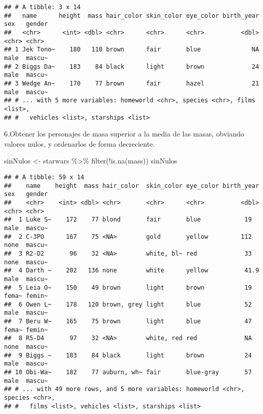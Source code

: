 \documentclass[
]{book}
\newenvironment{Shaded}{\begin{snugshade}}{\end{snugshade}}
\newcommand{\FunctionTok}[1]{\textcolor[rgb]{0.00,0.00,0.00}{#1}}
\newcommand{\NormalTok}[1]{#1}
\newcommand{\OtherTok}[1]{\textcolor[rgb]{0.56,0.35,0.01}{#1}}
\newcommand{\SpecialCharTok}[1]{\textcolor[rgb]{0.00,0.00,0.00}{#1}}
\begin{document}
\begin{verbatim}
## # A tibble: 3 x 14
##   name      height  mass hair_color skin_color eye_color birth_year sex   gender
##   <chr>      <int> <dbl> <chr>      <chr>      <chr>          <dbl> <chr> <chr> 
## 1 Jek Tono~    180   110 brown      fair       blue              NA male  mascu~
## 2 Biggs Da~    183    84 black      light      brown             24 male  mascu~
## 3 Wedge An~    170    77 brown      fair       hazel             21 male  mascu~
## # ... with 5 more variables: homeworld <chr>, species <chr>, films <list>,
## #   vehicles <list>, starships <list>
\end{verbatim}

6.Obtener los personajes de masa superior a la media de las masas, obviando valores nulos, y ordenarlos de forma decreciente.

\begin{Shaded}
\begin{Highlighting}[]
\NormalTok{sinNulos }\OtherTok{\textless{}{-}}\NormalTok{ starwars }\SpecialCharTok{\%\textgreater{}\%} \FunctionTok{filter}\NormalTok{(}\SpecialCharTok{!}\FunctionTok{is.na}\NormalTok{(mass))}
\NormalTok{sinNulos}
\end{Highlighting}
\end{Shaded}

\begin{verbatim}
## # A tibble: 59 x 14
##    name    height  mass hair_color  skin_color eye_color birth_year sex   gender
##    <chr>    <int> <dbl> <chr>       <chr>      <chr>          <dbl> <chr> <chr> 
##  1 Luke S~    172    77 blond       fair       blue            19   male  mascu~
##  2 C-3PO      167    75 <NA>        gold       yellow         112   none  mascu~
##  3 R2-D2       96    32 <NA>        white, bl~ red             33   none  mascu~
##  4 Darth ~    202   136 none        white      yellow          41.9 male  mascu~
##  5 Leia O~    150    49 brown       light      brown           19   fema~ femin~
##  6 Owen L~    178   120 brown, grey light      blue            52   male  mascu~
##  7 Beru W~    165    75 brown       light      blue            47   fema~ femin~
##  8 R5-D4       97    32 <NA>        white, red red             NA   none  mascu~
##  9 Biggs ~    183    84 black       light      brown           24   male  mascu~
## 10 Obi-Wa~    182    77 auburn, wh~ fair       blue-gray       57   male  mascu~
## # ... with 49 more rows, and 5 more variables: homeworld <chr>, species <chr>,
## #   films <list>, vehicles <list>, starships <list>
\end{verbatim}
\end{document}
